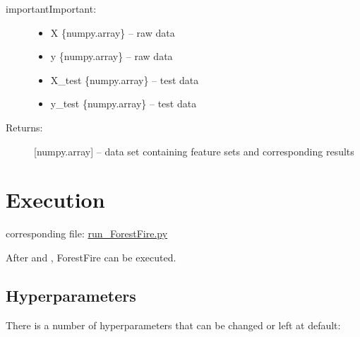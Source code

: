 \documentclass[letterpaper,10pt,english]{sphinxmanual}
\begin{document}
\begin{sphinxadmonition}{important}{Important:}
\begin{fulllineitems}
\begin{description}
\begin{itemize}
\item {} 
X \{numpy.array\} -- raw data

\item {} 
y \{numpy.array\} -- raw data

\item {} 
X\_test \{numpy.array\} -- test data

\item {} 
y\_test \{numpy.array\} -- test data

\end{itemize}

\item[{Returns:}] \leavevmode
{[}numpy.array{]} -- data set containing feature sets and corresponding results

\end{description}

\end{fulllineitems}

\end{sphinxadmonition}
\label{\detokenize{Generate_Database:blank}}\begin{figure}[htbp]
\centering

\noindent{}
\label{\detokenize{Generate_Database:blank}}\end{figure}


\section{Execution}
\label{\detokenize{execution:execution}}\label{\detokenize{execution::doc}}\label{\detokenize{execution:id1}}
corresponding file: \href{https://github.com/weinertmos/ForestFire/blob/master/source/ForestFire/run\_ForestFire.py}{run\_ForestFire.py}

After {\hyperref[\detokenize{Importing_Data:import-data}]{}} and {\hyperref[\detokenize{Generate_Database:compute}]{}}, ForestFire can be executed.


\subsection{Hyperparameters}
\label{\detokenize{execution:hyperparameters}}\label{\detokenize{execution:id2}}
There is a number of hyperparameters that can be changed or left at default:
\end{document}
